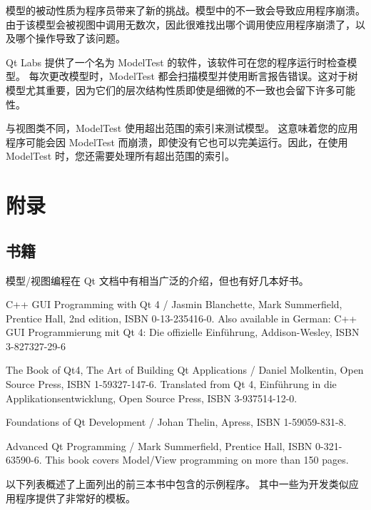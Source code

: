 模型的被动性质为程序员带来了新的挑战。模型中的不一致会导致应用程序崩溃。
由于该模型会被视图中调用无数次，因此很难找出哪个调用使应用程序崩溃了，以及哪个操作导致了该问题。

Qt Labs 提供了一个名为 ModelTest 的软件，该软件可在您的程序运行时检查模型。
每次更改模型时，ModelTest 都会扫描模型并使用断言报告错误。这对于树模型尤其重要，因为它们的层次结构性质即使是细微的不一致也会留下许多可能性。

与视图类不同，ModelTest 使用超出范围的索引来测试模型。
这意味着您的应用程序可能会因 ModelTest 而崩溃，即使没有它也可以完美运行。因此，在使用 ModelTest 时，您还需要处理所有超出范围的索引。

\section{附录}
\subsection{书籍}

模型/视图编程在 Qt 文档中有相当广泛的介绍，但也有好几本好书。

\begin{compactitem}
\item C++ GUI Programming with Qt 4 / Jasmin Blanchette, Mark Summerfield, Prentice Hall, 2nd edition, ISBN 0-13-235416-0. 
      Also available in German: C++ GUI Programmierung mit Qt 4: Die offizielle Einführung, Addison-Wesley, ISBN 3-827327-29-6
\item The Book of Qt4, The Art of Building Qt Applications / Daniel Molkentin, Open Source Press, ISBN 1-59327-147-6. 
      Translated from Qt 4, Einführung in die Applikationsentwicklung, Open Source Press, ISBN 3-937514-12-0.
\item Foundations of Qt Development / Johan Thelin, Apress, ISBN 1-59059-831-8.
\item Advanced Qt Programming / Mark Summerfield, Prentice Hall, ISBN 0-321-63590-6. 
      This book covers Model/View programming on more than 150 pages.
\end{compactitem}

以下列表概述了上面列出的前三本书中包含的示例程序。
其中一些为开发类似应用程序提供了非常好的模板。

